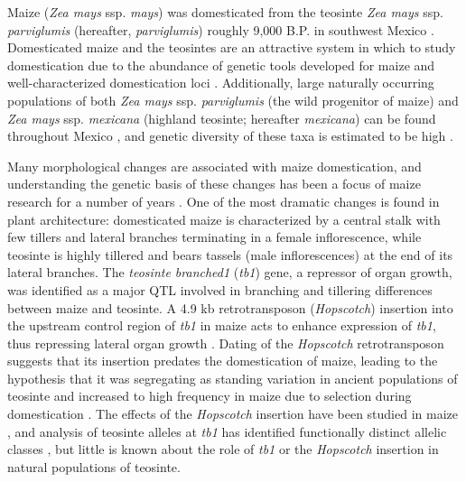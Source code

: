 \documentclass[11pt]{article}
\begin{document}
\begin{linenumbers}
\begin{flushleft}
Maize (\emph{Zea mays} ssp. \emph{mays}) was domesticated from the teosinte \emph{Zea mays} ssp. \emph{parviglumis} (hereafter, \emph{parviglumis}) roughly 9,000 B.P. in southwest Mexico \citep{Piperno2009, Matsuoka2002}. Domesticated maize and the teosintes are an attractive system in which to study domestication due to the abundance of genetic tools developed for maize and well-characterized domestication loci \citep{Hufford2012a, Doebley2004, Hufford2012b}. Additionally, large naturally occurring populations of both \emph{Zea mays} ssp. \emph{parviglumis} (the wild progenitor of maize) and \emph{Zea mays} ssp. \emph{mexicana} (highland teosinte; hereafter \emph{mexicana}) can be found throughout Mexico \citep{Wilkes1977, Hufford2013}, and genetic diversity of these taxa is estimated to be high \citep{Ross-Ibarra2009}.

Many morphological changes are associated with maize domestication, and understanding the genetic basis of these changes has been a focus of maize research for a number of years \citep{Doebley2004}. One of the most dramatic changes is found in plant architecture: domesticated maize is characterized by a central stalk with few tillers and lateral branches terminating in a female inflorescence, while teosinte is highly tillered and bears tassels (male inflorescences) at the end of its lateral branches. The \emph{teosinte branched1} (\emph{tb1}) gene, a repressor of organ growth, was identified as a major QTL involved in  branching \citep{DoebleyStecGustus1995} and tillering \citep{DoebleyStec1991} differences between maize and teosinte.  A 4.9 kb retrotransposon (\emph{Hopscotch}) insertion into the upstream control region of \emph{tb1} in maize acts to enhance expression of \emph{tb1}, thus repressing lateral organ growth \citep{Doebley1997, Studer2011}.  Dating of the \emph{Hopscotch} retrotransposon suggests that its insertion predates the domestication of maize, leading to the hypothesis that it was segregating as standing variation in ancient populations of teosinte and increased to high frequency in maize due to selection during domestication \citep{Studer2011}. The effects of the \emph{Hopscotch} insertion have been studied in maize \citep{Studer2011}, and analysis of teosinte alleles at \emph{tb1} has identified functionally distinct allelic classes \citep{StuderDoebley2012}, but little is known about the role of \emph{tb1} or the \emph{Hopscotch} insertion in natural populations of teosinte.


\end{flushleft}
\end{linenumbers}
\end{document}
